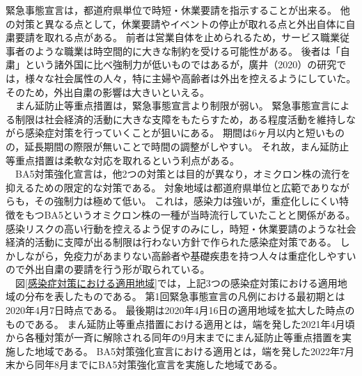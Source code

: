 \documentclass[paper={210mm,297mm},line_length=35zw,number_of_lines=31,head_space=30mm,gutter=40mm,baselineskip=2.0zw,headfoot_verticalposition=1.5zw]{jlreq} %
\begin{document}
緊急事態宣言は，都道府県単位で時短・休業要請を指示することが出来る。
他の対策と異なる点として，休業要請やイベントの停止が取れる点と外出自体に自粛要請を取れる点がある。
前者は営業自体を止められるため，サービス職業従事者のような職業は時空間的に大きな制約を受ける可能性がある。
後者は「自粛」という諸外国に比べ強制力が低いものではあるが，廣井（2020）の研究では，様々な社会属性の人々，特に主婦や高齢者は外出を控えるようにしていた。
そのため，外出自粛の影響は大きいといえる。\\
　まん延防止等重点措置は，緊急事態宣言より制限が弱い。
緊急事態宣言による制限は社会経済的活動に大きな支障をもたらすため，ある程度活動を維持しながら感染症対策を行っていくことが狙いにある。
期間は6ヶ月以内と短いものの，延長期間の際限が無いことで時間の調整がしやすい。
それ故，まん延防止等重点措置は柔軟な対応を取れるという利点がある。\\
　BA5対策強化宣言は，他2つの対策とは目的が異なり，オミクロン株の流行を抑えるための限定的な対策である。
対象地域は都道府県単位と広範でありながらも，その強制力は極めて低い。
これは，感染力は強いが，重症化しにくい特徴をもつBA5というオミクロン株の一種が当時流行していたことと関係がある。
感染リスクの高い行動を控えるよう促すのみにし，時短・休業要請のような社会経済的活動に支障が出る制限は行わない方針で作られた感染症対策である。
しかしながら，免疫力があまりない高齢者や基礎疾患を持つ人々は重症化しやすいので外出自粛の要請を行う形が取られている。\\
　図\ref{感染症対策における適用地域}では，上記3つの感染症対策における適用地域の分布を表したものである。
第1回緊急事態宣言の凡例における最初期とは2020年4月7日時点である。
最後期は2020年4月16日の適用地域を拡大した時点のものである。
まん延防止等重点措置における適用とは，端を発した2021年4月頃から各種対策が一斉に解除される同年の9月末までにまん延防止等重点措置を実施した地域である。
BA5対策強化宣言における適用とは，端を発した2022年7月末から同年8月までにBA5対策強化宣言を実施した地域である。\\
\end{document}
